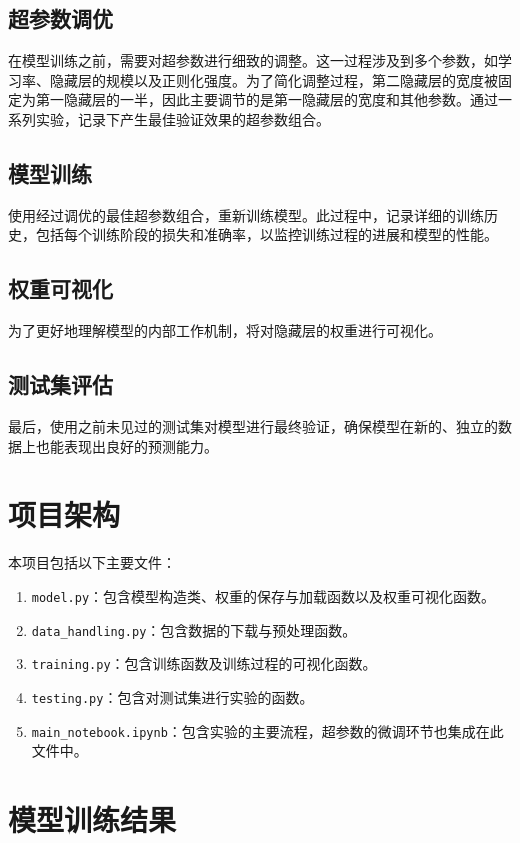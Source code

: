\documentclass[a4paper,12pt]{article}
\begin{document}
\subsection{超参数调优}
在模型训练之前，需要对超参数进行细致的调整。这一过程涉及到多个参数，如学习率、隐藏层的规模以及正则化强度。为了简化调整过程，第二隐藏层的宽度被固定为第一隐藏层的一半，因此主要调节的是第一隐藏层的宽度和其他参数。通过一系列实验，记录下产生最佳验证效果的超参数组合。

\subsection{模型训练}
使用经过调优的最佳超参数组合，重新训练模型。此过程中，记录详细的训练历史，包括每个训练阶段的损失和准确率，以监控训练过程的进展和模型的性能。

\subsection{权重可视化}
为了更好地理解模型的内部工作机制，将对隐藏层的权重进行可视化。

\subsection{测试集评估}
最后，使用之前未见过的测试集对模型进行最终验证，确保模型在新的、独立的数据上也能表现出良好的预测能力。


\section{项目架构}
本项目包括以下主要文件：
\begin{enumerate}
    \item \texttt{model.py}：包含模型构造类、权重的保存与加载函数以及权重可视化函数。
    \item \texttt{data\_handling.py}：包含数据的下载与预处理函数。
    \item \texttt{training.py}：包含训练函数及训练过程的可视化函数。
    \item \texttt{testing.py}：包含对测试集进行实验的函数。
    \item \texttt{main\_notebook.ipynb}：包含实验的主要流程，超参数的微调环节也集成在此文件中。
\end{enumerate}



\section{模型训练结果}
\end{document}
